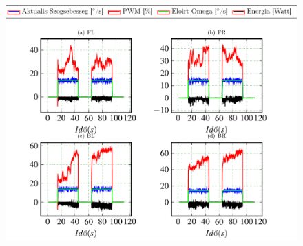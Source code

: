 \begin{figure}[H]
  \includegraphics{tikz/HlejtoKerek.pdf}
  \caption{}
  \label{fig:HlejtoKerek}
\end{figure}












